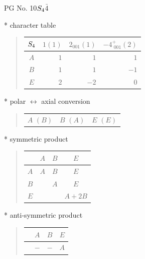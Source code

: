 \documentclass[fleqn,8pt,landscape]{jsarticle}
\begin{document}
\setcounter{MaxMatrixCols}{32}

\renewcommand{\tablename}{Table~}
\renewcommand{\figurename}{Figure~}
\begin{center}
\LARGE
PG No. 10\quad$S_{\rm 4}$\quad$\bar{4}$\quad[ tetragonal ]
\end{center}

* character table
\begin{quote}
\begin{tabular}{crrr} \hline \hline
$ S_{\rm 4} $ & $ 1(1) $ & $ 2{}_{001}(1) $ & $ -4^{+}_{\,\,001}(2) $ \\ \hline
$ A $ & $ 1 $ & $ 1 $ & $ 1 $ \\
$ B $ & $ 1 $ & $ 1 $ & $ -1 $ \\
$ E $ & $ 2 $ & $ -2 $ & $ 0 $ \\
 \hline \hline
\end{tabular}
\end{quote}

* polar $\leftrightarrow$ axial conversion
\begin{quote}
\begin{tabular}{ccc}
$ A\,\,(B) $ & $ B\,\,(A) $ & $ E\,\,(E) $
\end{tabular}
\end{quote}

* symmetric product
\begin{quote}
\begin{tabular}{c|ccc} \hline \hline
 & $ A $ & $ B $ & $ E $ \\ \hline
$ A $ & $ A $ & $ B $ & $ E $ \\
$ B $ & $  $ & $ A $ & $ E $ \\
$ E $ & $  $ & $  $ & $ A + 2 B $ \\
 \hline \hline
\end{tabular}
\end{quote}

* anti-symmetric product
\begin{quote}
\begin{tabular}{cccc} \hline \hline
 & $ A $ & $ B $ & $ E $ \\ \hline
$  $ & $ - $ & $ - $ & $ A $ \\
 \hline \hline
\end{tabular}
\end{quote}
\end{document}
